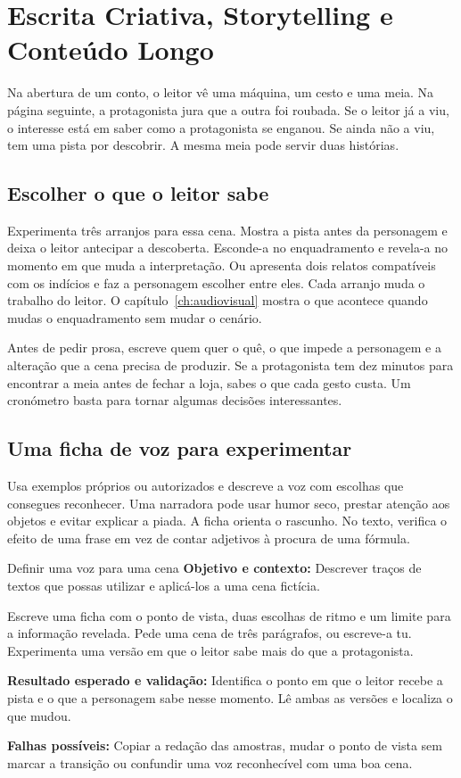 \chapter{Escrita Criativa, Storytelling e Conteúdo Longo}
\label{ch:criatividade}

\ficcao Na abertura de um conto, o leitor vê uma máquina, um cesto e uma meia. Na página seguinte, a protagonista jura que a outra foi roubada. Se o leitor já a viu, o interesse está em saber como a protagonista se enganou. Se ainda não a viu, tem uma pista por descobrir. A mesma meia pode servir duas histórias.

\section{Escolher o que o leitor sabe}

Experimenta três arranjos para essa cena. Mostra a pista antes da personagem e deixa o leitor antecipar a descoberta. Esconde-a no enquadramento e revela-a no momento em que muda a interpretação. Ou apresenta dois relatos compatíveis com os indícios e faz a personagem escolher entre eles. Cada arranjo muda o trabalho do leitor. O capítulo~\ref{ch:audiovisual} mostra o que acontece quando mudas o enquadramento sem mudar o cenário.

Antes de pedir prosa, escreve quem quer o quê, o que impede a personagem e a alteração que a cena precisa de produzir. Se a protagonista tem dez minutos para encontrar a meia antes de fechar a loja, sabes o que cada gesto custa. Um cronómetro basta para tornar algumas decisões interessantes.

\section{Uma ficha de voz para experimentar}

Usa exemplos próprios ou autorizados e descreve a voz com escolhas que consegues reconhecer. Uma narradora pode usar humor seco, prestar atenção aos objetos e evitar explicar a piada. A ficha orienta o rascunho. No texto, verifica o efeito de uma frase em vez de contar adjetivos à procura de uma fórmula.

\begin{promptlabbox}{Definir uma voz para uma cena}
\textbf{Objetivo e contexto:} Descrever traços de textos que possas utilizar e aplicá-los a uma cena fictícia.

Escreve uma ficha com o ponto de vista, duas escolhas de ritmo e um limite para a informação revelada. Pede uma cena de três parágrafos, ou escreve-a tu. Experimenta uma versão em que o leitor sabe mais do que a protagonista.

\textbf{Resultado esperado e validação:} Identifica o ponto em que o leitor recebe a pista e o que a personagem sabe nesse momento. Lê ambas as versões e localiza o que mudou.

\textbf{Falhas possíveis:} Copiar a redação das amostras, mudar o ponto de vista sem marcar a transição ou confundir uma voz reconhecível com uma boa cena.
\end{promptlabbox}

